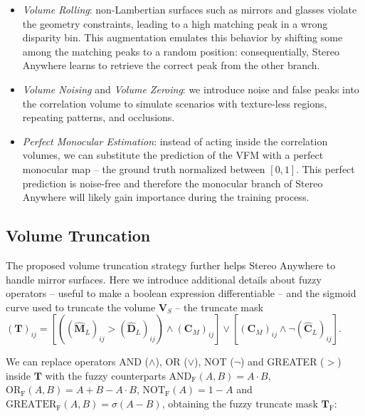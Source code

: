 \documentclass[10pt,twocolumn,letterpaper]{article}
\newcommand{\method}[0]{Stereo Anywhere\xspace}
\begin{document}
\begin{itemize}
    \item \textit{Volume Rolling}: non-Lambertian surfaces such as mirrors and glasses violate the geometry constraints, leading to a high matching peak in a wrong disparity bin. This augmentation emulates this behavior by shifting some among the matching peaks to a random position: consequentially, \method learns to retrieve the correct peak from the other branch. \\
    \item \textit{Volume Noising} and \textit{Volume Zeroing}: we introduce noise and false peaks into the correlation volume to simulate scenarios with texture-less regions, repeating patterns, and occlusions. \\
    \item \textit{Perfect Monocular Estimation}: instead of acting inside the correlation volumes, we can substitute the prediction of the VFM with a perfect monocular map  -- the ground truth normalized between $[0,1]$. This perfect prediction is noise-free and therefore the monocular branch of \method will likely gain importance during the training process.
\end{itemize}


\phantom{Invisible Text}
\vspace{-\baselineskip}

\subsection{Volume Truncation}

\label{subsec:vol_trunc}

The proposed volume truncation strategy further helps \method to handle mirror surfaces.
Here we introduce additional details about fuzzy operators -- useful to make a boolean expression differentiable -- and the sigmoid curve used to truncate the volume $\mathbf{V}_S$  -- the truncate mask $(\mathbf{T})_{ij} = \left[\left((\hat{\mathbf{M}}_L)_{ij} >(\hat{\mathbf{D}}_L)_{ij}\right) \land (\mathbf{C}_M)_{ij} \right] \lor \left[ (\mathbf{C}_M)_{ij} \land \neg(\hat{\mathbf{C}}_L)_{ij} \right]$.

We can replace operators AND ($\land$), OR ($\lor$), NOT ($\neg$) and GREATER ($>$) inside $\mathbf{T}$ with the fuzzy counterparts $\text{AND}_\text{F}(A,B) = A \cdot B$, $\text{OR}_\text{F}(A,B) = A+B-A \cdot B$, $\text{NOT}_\text{F}(A) = 1- A$ and $\text{GREATER}_\text{F}(A,B) = \sigma(A-B)$, obtaining the fuzzy truncate mask $\mathbf{T}_\text{F}$:
\end{document}
